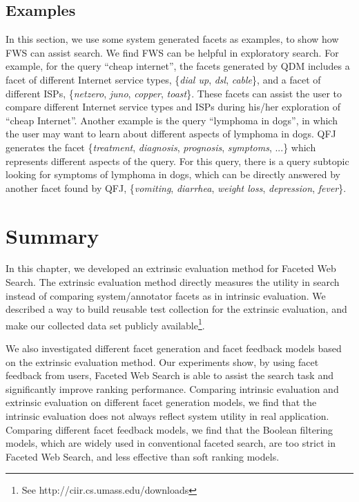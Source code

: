 \subsection{Examples}
In this section, we use some system generated facets as examples, to show how FWS can assist search. We find FWS can be helpful in exploratory search. 
For example, for the query ``cheap internet'', the facets generated by QDM includes a facet of different Internet service types, \{\textit{dial up}, \textit{dsl}, \textit{cable}\}, and a facet of different ISPs, \{\textit{netzero}, \textit{juno}, \textit{copper}, \textit{toast}\}. These facets can assist the user to compare different Internet service types and ISPs during his/her exploration of ``cheap Internet''. Another example is the query ``lymphoma in dogs'', in which the user may want to learn about different aspects of lymphoma in dogs. QFJ generates the facet \{\textit{treatment}, \textit{diagnosis}, \textit{prognosis}, \textit{symptoms}, ...\} which represents different aspects of the query. For this query, there is a query subtopic looking for symptoms of lymphoma in dogs, which can be directly answered by another facet found by QFJ, \{\textit{vomiting}, \textit{diarrhea}, \textit{weight loss}, \textit{depression}, \textit{fever}\}. 


\section{Summary} 
\label{sec:ee-conclusions}
In this chapter, we developed an extrinsic evaluation method for Faceted Web Search. The extrinsic evaluation method directly measures the utility in search instead of comparing system/annotator facets as in intrinsic evaluation. We described a way to build reusable test collection for the extrinsic evaluation, and make our collected data set publicly available\footnote{See http://ciir.cs.umass.edu/downloads}.

We also investigated different facet generation and facet feedback models based on the extrinsic evaluation method.
Our experiments show, by using facet feedback from users, Faceted Web Search is able to assist the search task and significantly improve ranking performance.
Comparing intrinsic evaluation and extrinsic evaluation on different facet generation models, we find that the intrinsic evaluation does not always reflect system utility in real application. Comparing different facet feedback models, we find that the Boolean filtering models, which are widely used in conventional faceted search, are too strict in Faceted Web Search, and less effective than soft ranking models.
